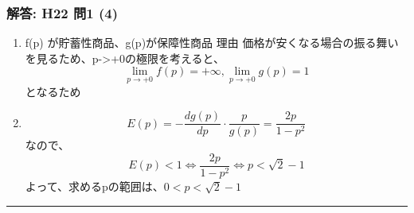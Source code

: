 \documentclass[]{article}
\begin{document}
\hypertarget{ux89e3ux7b54-h22-ux554f1-4}{%
\subsubsection{解答: H22 問1 (4)}\label{ux89e3ux7b54-h22-ux554f1-4}}

\begin{enumerate}
\def\labelenumi{\arabic{enumi}.}
\tightlist
\item
  f(p) が貯蓄性商品、g(p)が保障性商品 理由
  価格が安くなる場合の振る舞いを見るため、p-\textgreater+0の極限を考えると、
  \[\lim_{p\to+0}f(p)=+\infty, \lim_{p\to+0}g(p)=1\] となるため
\item
  \[E(p)=-\frac{dg(p)}{dp}\cdot\frac{p}{g(p)}=\frac{2p}{1-p^2}\]なので、
  \[E(p) < 1 \Leftrightarrow\frac{2p}{1-p^2}\Leftrightarrow p < \sqrt{2}-1\]
  よって、求めるpの範囲は、\(0 < p < \sqrt{2}-1\)
\end{enumerate}

\begin{center}\rule{0.5\linewidth}{0.5pt}\end{center}
\end{document}
